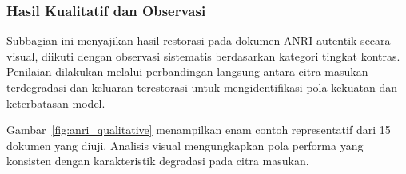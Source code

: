 \subsubsection{Hasil Kualitatif dan Observasi}
\label{subsubsec:anri-hasil-observasi}

Subbagian ini menyajikan hasil restorasi pada dokumen ANRI autentik secara visual, diikuti dengan observasi sistematis berdasarkan kategori tingkat kontras. Penilaian dilakukan melalui perbandingan langsung antara citra masukan terdegradasi dan keluaran terestorasi untuk mengidentifikasi pola kekuatan dan keterbatasan model.

Gambar~\ref{fig:anri_qualitative} menampilkan enam contoh representatif dari 15 dokumen yang diuji. Analisis visual mengungkapkan pola performa yang konsisten dengan karakteristik degradasi pada citra masukan.

